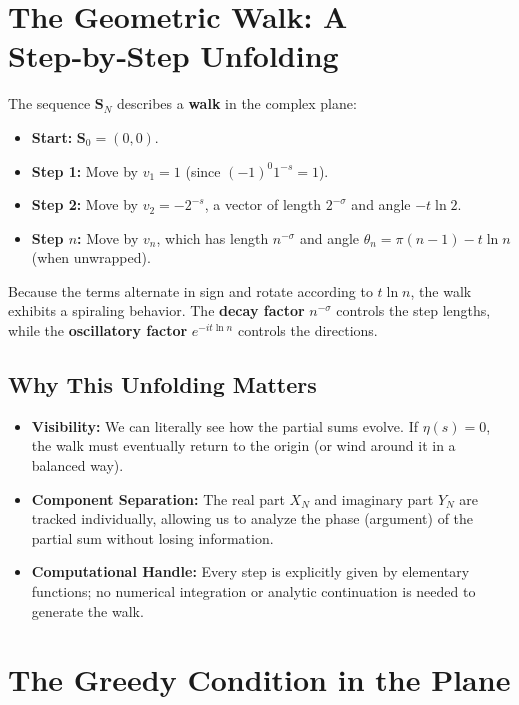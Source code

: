 \documentclass[12pt,a4paper]{article}
\begin{document}
\section{The Geometric Walk: A Step‑by‑Step Unfolding}

The sequence \(\mathbf{S}_N\) describes a \textbf{walk} in the complex plane:

\begin{itemize}
    \item \textbf{Start:} \(\mathbf{S}_0 = (0,0)\).
    \item \textbf{Step 1:} Move by \( v_1 = 1 \) (since \( (-1)^{0} 1^{-s} = 1 \)).
    \item \textbf{Step 2:} Move by \( v_2 = -2^{-s} \), a vector of length \(2^{-\sigma}\) and angle \(-t\ln 2\).
    \item \textbf{Step \( n \):} Move by \( v_n \), which has length \( n^{-\sigma} \) and angle \( \theta_n = \pi(n-1) - t\ln n\) (when unwrapped).
\end{itemize}

Because the terms alternate in sign and rotate according to \( t\ln n \), the walk exhibits a spiraling behavior. The \textbf{decay factor} \( n^{-\sigma} \) controls the step lengths, while the \textbf{oscillatory factor} \( e^{-it\ln n} \) controls the directions.

\subsection*{Why This Unfolding Matters}
\begin{itemize}
    \item \textbf{Visibility:} We can literally see how the partial sums evolve. If \(\eta(s) = 0\), the walk must eventually return to the origin (or wind around it in a balanced way).
    \item \textbf{Component Separation:} The real part \(X_N\) and imaginary part \(Y_N\) are tracked individually, allowing us to analyze the phase (argument) of the partial sum without losing information.
    \item \textbf{Computational Handle:} Every step is explicitly given by elementary functions; no numerical integration or analytic continuation is needed to generate the walk.
\end{itemize}

\section{The Greedy Condition in the Plane}
\end{document}
